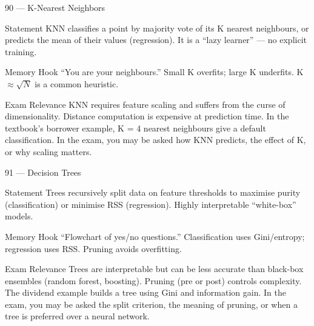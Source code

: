 \documentclass[aspectratio=169,8pt]{beamer}
\begin{document}
	\begin{frame}{90 --- K-Nearest Neighbors}
		\begin{block}{Statement}
			KNN classifies a point by majority vote of its K nearest neighbours, or predicts the mean of their values (regression). It is a ``lazy learner'' --- no explicit training.
		\end{block}
		\begin{block}{Memory Hook}
			``You are your neighbours.'' Small K overfits; large K underfits. K $\approx \sqrt{N}$ is a common heuristic.
		\end{block}
		\begin{block}{Exam Relevance}
			KNN requires feature scaling and suffers from the curse of dimensionality. Distance computation is expensive at prediction time. In the textbook's borrower example, K = 4 nearest neighbours give a default classification. In the exam, you may be asked how KNN predicts, the effect of K, or why scaling matters.
		\end{block}
	\end{frame}
	
	\begin{frame}{91 --- Decision Trees}
		\begin{block}{Statement}
			Trees recursively split data on feature thresholds to maximise purity (classification) or minimise RSS (regression). Highly interpretable ``white-box'' models.
		\end{block}
		\begin{block}{Memory Hook}
			``Flowchart of yes/no questions.'' Classification uses Gini/entropy; regression uses RSS. Pruning avoids overfitting.
		\end{block}
		\begin{block}{Exam Relevance}
			Trees are interpretable but can be less accurate than black-box ensembles (random forest, boosting). Pruning (pre or post) controls complexity. The dividend example builds a tree using Gini and information gain. In the exam, you may be asked the split criterion, the meaning of pruning, or when a tree is preferred over a neural network.
		\end{block}
	\end{frame}
	
\end{document}
